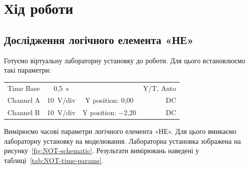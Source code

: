 \documentclass[a4paper,oneside,DIV=10,12pt]{scrartcl}
\begin{document}
	\section{Хід роботи}
		\subsection{Дослідження логічного елемента «НЕ»}
			Готуємо віртуальну лабораторну установку до роботи. Для цього встановлюємо такі параметри:
			\begin{table}[!htbp]
			\centering
				\begin{tabular}{lccr}
				Time Base & 0{,}5~s  &                     & Y/T, Auto\\
				Channel A & 10~V/div & Y position: 0{,}00  & DC\\
				Channel B & 10~V/div & Y position: −2{,}20 & DC\\
				\end{tabular}
			\end{table}
			
			Вимірюємо часові параметри логічного елемента «НЕ». Для цього вмикаємо лабораторну установку на моделювання. Лабораторна установка зображена на рисунку~\ref{fig:NOT-schematic}. Результати вимірювань наведені у таблиці~\ref{tab:NOT-time-params}.
			
\end{document}
